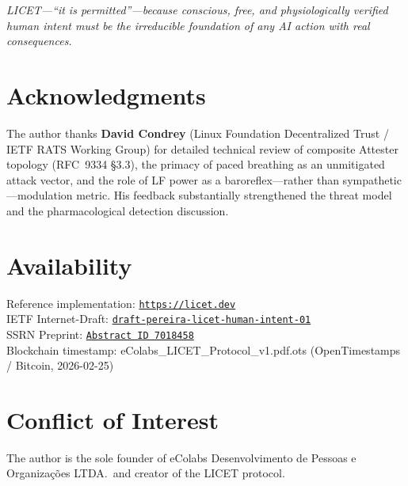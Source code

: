 \documentclass[12pt,a4paper]{article}
\begin{document}
\textit{LICET---``it is permitted''---because conscious, free, and
physiologically verified human intent must be the irreducible foundation of
any AI action with real consequences.}

\section*{Acknowledgments}

The author thanks \textbf{David Condrey} (Linux Foundation Decentralized Trust
/ IETF RATS Working Group) for detailed technical review of composite Attester
topology (RFC~9334 \S3.3), the primacy of paced breathing as an unmitigated
attack vector, and the role of LF power as a baroreflex---rather than
sympathetic---modulation metric. His feedback substantially strengthened the
threat model and the pharmacological detection discussion.

\section*{Availability}

Reference implementation: \href{https://licet.dev}{\texttt{https://licet.dev}}\\
IETF Internet-Draft: \href{https://datatracker.ietf.org/doc/draft-pereira-licet-human-intent/}{\texttt{draft-pereira-licet-human-intent-01}}\\
SSRN Preprint: \href{https://papers.ssrn.com/sol3/papers.cfm?abstract_id=7018458}{\texttt{Abstract ID 7018458}}\\
Blockchain timestamp: eColabs\_LICET\_Protocol\_v1.pdf.ots (OpenTimestamps / Bitcoin, 2026-02-25)

\section*{Conflict of Interest}

The author is the sole founder of eColabs Desenvolvimento de Pessoas e
Organizações LTDA.\ and creator of the LICET protocol.
\end{document}

